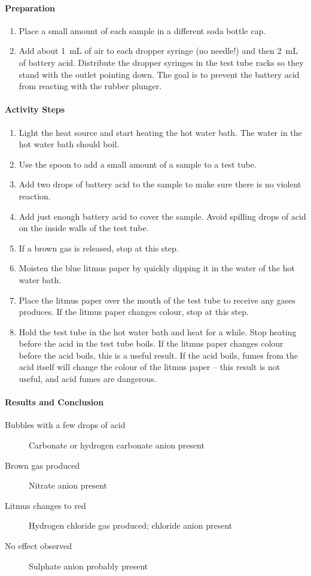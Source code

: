 \paragraph{Preparation}
\begin{enumerate}
\item{Place a small amount of each sample in a different soda bottle cap.}
\item{Add about 1~mL of air to each dropper syringe (no needle!) and then 2~mL of battery acid. Distribute the dropper syringes in the test tube racks so they stand with the outlet pointing down. The goal is to prevent the battery acid from reacting with the rubber plunger.}
\end{enumerate}

\paragraph{Activity Steps}
\begin{enumerate}
\item{Light the heat source and start heating the hot water bath. The water in the hot water bath should boil.}
\item{Use the spoon to add a small amount of a sample to a test tube.}
\item{Add two drops of battery acid to the sample to make sure there is no violent reaction.}
\item{Add just enough battery acid to cover the sample. Avoid spilling drops of acid on the inside walls of the test tube.}
\item{If a brown gas is released, stop at this step.}
\item{Moisten the blue litmus paper by quickly dipping it in the water of the hot water bath.}
\item{Place the litmus paper over the mouth of the test tube to receive any gases produces. If the litmus paper changes colour, stop at this step.}
\item{Hold the test tube in the hot water bath and heat for a while. Stop heating before the acid in the test tube boils. If the litmus paper changes colour before the acid boils, this is a useful result. If the acid boils, fumes from the acid itself will change the colour of the litmus paper -- this result is not useful, and acid fumes are dangerous.}
\end{enumerate}

\paragraph{Results and Conclusion}
\begin{description}
\item[Bubbles with a few drops of acid]{Carbonate or hydrogen carbonate anion  present}
\item[Brown gas produced]{Nitrate anion present}
\item[Litmus changes to red]{Hydrogen chloride gas produced; chloride anion present}
\item[No effect observed]{Sulphate anion probably present}
\end{description}

